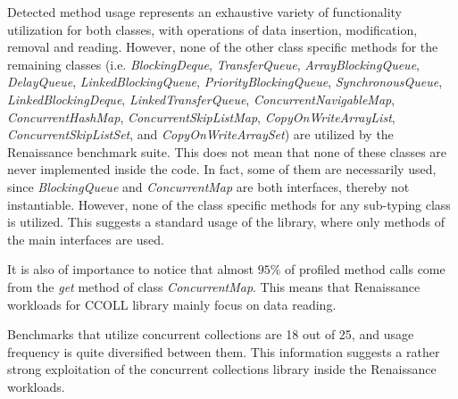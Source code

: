 \documentclass[]{usiinfthesis}
\begin{document}
 Detected method usage represents an exhaustive variety of functionality utilization for both classes, with operations of data insertion, modification, removal and reading. However, none of the other class specific methods for the remaining classes (i.e. \textit{BlockingDeque}, \textit{TransferQueue}, \textit{ArrayBlockingQueue}, \textit{DelayQueue}, \textit{LinkedBlockingQueue}, \textit{PriorityBlockingQueue}, \textit{SynchronousQueue}, \textit{LinkedBlockingDeque}, \textit{LinkedTransferQueue}, \textit{ConcurrentNavigableMap}, \textit{ConcurrentHashMap}, \textit{ConcurrentSkipListMap}, \textit{CopyOnWriteArrayList}, \textit{ConcurrentSkipListSet}, and \textit{CopyOnWriteArraySet}) are utilized by the Renaissance benchmark suite. This does not mean that none of these classes are never implemented inside the code. In fact, some of them are necessarily used, since \textit{BlockingQueue} and \textit{ConcurrentMap} are both interfaces, thereby not instantiable. However, none of the class specific methods for any sub-typing class is utilized. This suggests a standard usage of the library, where only methods of the main interfaces are used.
 
 It is also of importance to notice that almost \(95\%\) of profiled method calls come from the \textit{get} method of class \textit{ConcurrentMap}. This means that Renaissance workloads for CCOLL library mainly focus on data reading.
 
 Benchmarks that utilize concurrent collections are 18 out of 25, and usage frequency is quite diversified between them. This information suggests a rather strong exploitation of the concurrent collections library inside the Renaissance workloads.
\end{document}
